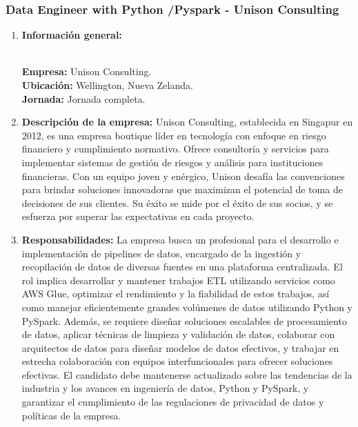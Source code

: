 \documentclass[12pt]{article}
\begin{document}
            \subsubsection{Data Engineer with Python /Pyspark - Unison Consulting}
                \begin{enumerate}
                    \item \textbf{Información general:}
                    
                        \textbf{\\Empresa:} Unison Consulting.
                        \textbf{\\Ubicación:} Wellington, Nueva Zelanda.
                        \textbf{\\Jornada:} Jornada completa.

                    \item \textbf{Descripción de la empresa:}
                        Unison Consulting, establecida en Singapur en 2012, es una empresa boutique líder en tecnología con enfoque en riesgo financiero y cumplimiento normativo. Ofrece consultoría y servicios para implementar sistemas de gestión de riesgos y análisis para instituciones financieras. Con un equipo joven y enérgico, Unison desafía las convenciones para brindar soluciones innovadoras que maximizan el potencial de toma de decisiones de sus clientes. Su éxito se mide por el éxito de sus socios, y se esfuerza por superar las expectativas en cada proyecto.

                    \item \textbf{Responsabilidades:}
                        La empresa busca un profesional para el desarrollo e implementación de pipelines de datos, encargado de la ingestión y recopilación de datos de diversas fuentes en una plataforma centralizada. El rol implica desarrollar y mantener trabajos ETL utilizando servicios como AWS Glue, optimizar el rendimiento y la fiabilidad de estos trabajos, así como manejar eficientemente grandes volúmenes de datos utilizando Python y PySpark. Además, se requiere diseñar soluciones escalables de procesamiento de datos, aplicar técnicas de limpieza y validación de datos, colaborar con arquitectos de datos para diseñar modelos de datos efectivos, y trabajar en estrecha colaboración con equipos interfuncionales para ofrecer soluciones efectivas. El candidato debe mantenerse actualizado sobre las tendencias de la industria y los avances en ingeniería de datos, Python y PySpark, y garantizar el cumplimiento de las regulaciones de privacidad de datos y políticas de la empresa.


\end{enumerate}
\end{document}
